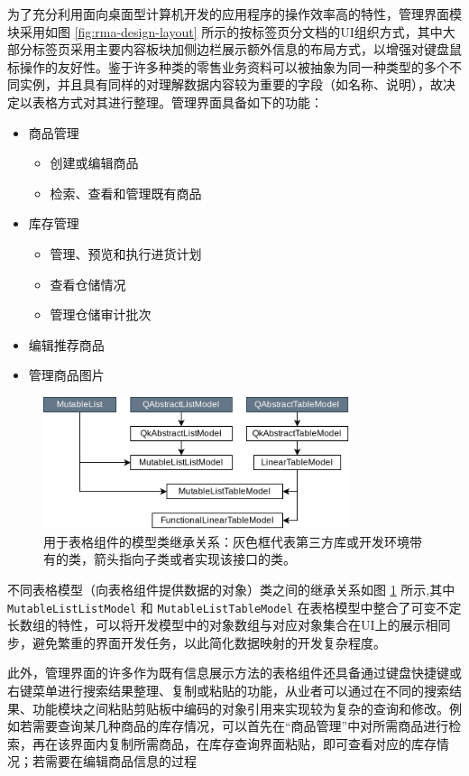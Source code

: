 为了充分利用面向桌面型计算机开发的应用程序的操作效率高的特性，管理界面模块采用如图 \ref{fig:rma-design-layout} 所示的按标签页分文档的UI组织方式，其中大部分标签页采用主要内容板块加侧边栏展示额外信息的布局方式，以增强对键盘鼠标操作的友好性。鉴于许多种类的零售业务资料可以被抽象为同一种类型的多个不同实例，并且具有同样的对理解数据内容较为重要的字段（如名称、说明），故决定以表格方式对其进行整理。管理界面具备如下的功能：

\begin{itemize}
	\item 商品管理
	\begin{itemize}
		\item 创建或编辑商品
		\item 检索、查看和管理既有商品
	\end{itemize}
	\item 库存管理
	\begin{itemize}
		\item 管理、预览和执行进货计划
		\item 查看仓储情况
		\item 管理仓储审计批次
	\end{itemize}
	\item 编辑推荐商品
	\item 管理商品图片
\end{itemize}

\begin{figure}[htbp]
	\centering
	\includegraphics[width=0.8\textwidth]{./imgs/rma-tables.png}
	\caption{用于表格组件的模型类继承关系：灰色框代表第三方库或开发环境带有的类，箭头指向子类或者实现该接口的类。}
	\label{fig:rma-tables}
\end{figure}

不同表格模型（向表格组件提供数据的对象）类之间的继承关系如图 \ref{fig:rma-tables} 所示,其中 \verb|MutableListListModel| 和 \verb|MutableListTableModel| 在表格模型中整合了可变不定长数组的特性，可以将开发模型中的对象数组与对应对象集合在UI上的展示相同步，避免繁重的界面开发任务，以此简化数据映射的开发复杂程度。

此外，管理界面的许多作为既有信息展示方法的表格组件还具备通过键盘快捷键或右键菜单进行搜索结果整理、复制或粘贴的功能，从业者可以通过在不同的搜索结果、功能模块之间粘贴剪贴板中编码的对象引用来实现较为复杂的查询和修改。例如若需要查询某几种商品的库存情况，可以首先在“商品管理”中对所需商品进行检索，再在该界面内复制所需商品，在库存查询界面粘贴，即可查看对应的库存情况；若需要在编辑商品信息的过程

